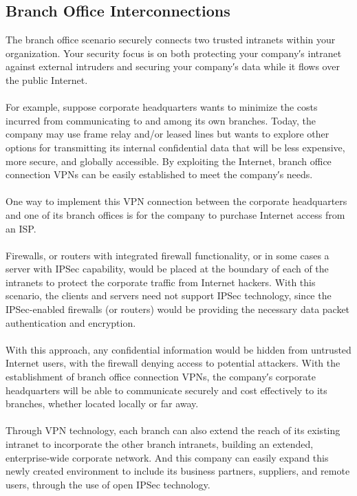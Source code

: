 \documentclass[10pt,a4paper]{article}
\begin{document}
\subsection{Branch Office Interconnections}
The branch office scenario securely connects two trusted intranets within your
organization. Your security focus is on both protecting your company′s intranet
against external intruders and securing your company′s data while it flows over
the public Internet. 
\\
\\
For example, suppose corporate headquarters wants to
minimize the costs incurred from communicating to and among its own branches.
Today, the company may use frame relay and/or leased lines but wants to explore
other options for transmitting its internal confidential data that will be less
expensive, more secure, and globally accessible. By exploiting the Internet,
branch office connection VPNs can be easily established to meet the company′s
needs.
\\
\\

One way to implement this VPN connection between the corporate headquarters and one of its branch offices is for the
company to purchase Internet access from an ISP. 
\\
\\
Firewalls, or routers with
integrated firewall functionality, or in some cases a server with IPSec capability,
would be placed at the boundary of each of the intranets to protect the corporate
traffic from Internet hackers. With this scenario, the clients and servers need not
support IPSec technology, since the IPSec-enabled firewalls (or routers) would
be providing the necessary data packet authentication and encryption.
\\
\\
With this
approach, any confidential information would be hidden from untrusted Internet
users, with the firewall denying access to potential attackers.
With the establishment of branch office connection VPNs, the company′s
corporate headquarters will be able to communicate securely and cost effectively
to its branches, whether located locally or far away.
\\
\\
Through VPN technology,
each branch can also extend the reach of its existing intranet to incorporate the
other branch intranets, building an extended, enterprise-wide corporate network.
And this company can easily expand this newly created environment to include its
business partners, suppliers, and remote users, through the use of open IPSec
technology.
\\
\end{document}
